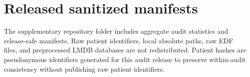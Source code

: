 \documentclass[11pt]{article}
\begin{document}
\section*{Released sanitized manifests}
The supplementary repository folder includes aggregate audit statistics and release-safe manifests. Raw patient identifiers, local absolute paths, raw EDF files, and preprocessed LMDB databases are not redistributed. Patient hashes are pseudonymous identifiers generated for this audit release to preserve within-audit consistency without publishing raw patient identifiers.
\end{document}
